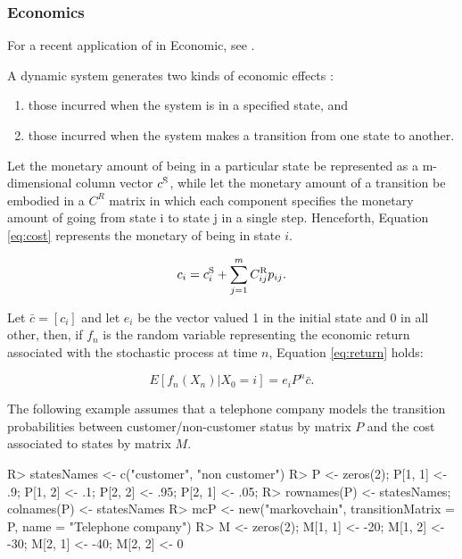 \documentclass[
  nojss]{jss}
\providecommand{\tightlist}{%
  \setlength{\itemsep}{0pt}\setlength{\parskip}{0pt}}
\begin{document}
\hypertarget{fin:ec}{%
\subsubsection{Economics}\label{fin:ec}}

For a recent application of  in Economic, see \cite{manchesterR}.

A dynamic system generates two kinds of economic effects \citep{bardPpt}:

\begin{enumerate}
\def\labelenumi{\arabic{enumi}.}
\tightlist
\item
  those incurred when the system is in a specified state, and
\item
  those incurred when the system makes a transition from one state to another.
\end{enumerate}

Let the monetary amount of being in a particular state be represented as a m-dimensional column vector \(c^{\rm{S}}\), while let the monetary amount of a transition be embodied in a \(C^{R}\) matrix in which each component specifies the monetary amount of going from state i to state j in a single step. Henceforth, Equation \eqref{eq:cost} represents the monetary of being in state \(i\).

\begin{equation}
{c_i} = c_i^{\rm{S}} + \sum\limits_{j = 1}^m {C_{ij}^{\rm{R}}} {p_{ij}}.
\label{eq:cost}
\end{equation}

Let \(\bar c = \left[ c_i \right]\) and let \(e_i\) be the vector valued 1 in the initial state and 0 in all other, then, if \(f_n\) is the random variable representing the economic return associated with the stochastic process at time \(n\), Equation \eqref{eq:return} holds:

\begin{equation}
E\left[ {{f_n}\left( {{X_n}} \right)|{X_0} = i} \right] = {e_i}{P^n}\bar c.
\label{eq:return}
\end{equation}

The following example assumes that a telephone company models the transition probabilities between customer/non-customer status by matrix \(P\) and the cost associated to states by matrix \(M\).

\begin{CodeChunk}

\begin{CodeInput}
R> statesNames <- c("customer", "non customer")
R> P <- zeros(2); P[1, 1] <- .9; P[1, 2] <- .1; P[2, 2] <- .95; P[2, 1] <- .05;
R> rownames(P) <- statesNames; colnames(P) <- statesNames
R> mcP <- new("markovchain", transitionMatrix = P, name = "Telephone company")
R> M <- zeros(2); M[1, 1] <- -20; M[1, 2] <- -30; M[2, 1] <- -40; M[2, 2] <- 0
\end{CodeInput}
\end{CodeChunk}
\end{document}
